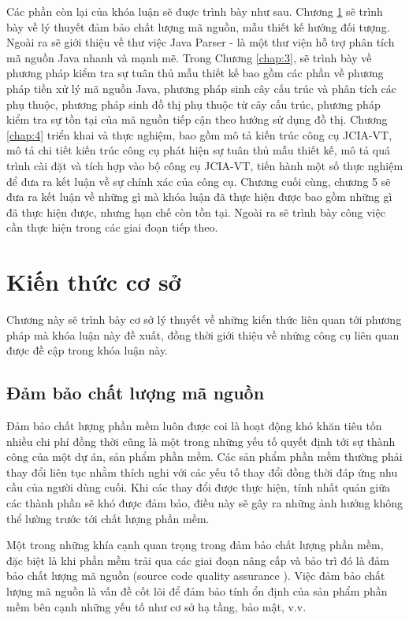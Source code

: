\documentclass[12pt]{report}
\begin{document}
\noindent Các phần còn lại của khóa luận sẽ đuợc trình bày như sau. Chương \ref{chap:background} sẽ trình bày về lý thuyết đảm bảo chất lượng mã nguồn, mẫu thiết kế hướng đối tượng. Ngoài ra sẽ giới thiệu về thư việc Java Parser - là một thư viện hỗ trợ phân tích mã nguồn Java nhanh và mạnh mẽ. Trong Chương \ref{chap:3}, sẽ trình bày về phương pháp kiểm tra sự tuân thủ mẫu thiết kế bao gồm các phần về phương pháp tiền xử lý mã nguồn Java, phương pháp sinh cây cấu trúc và phân tích các phụ thuộc, phương pháp sinh đồ thị phụ thuộc từ cây cấu trúc, phương pháp kiểm tra sự tồn tại của mã nguồn tiếp cận theo hướng sử dụng đồ thị. Chương \ref{chap:4} triển khai và thực nghiệm, bao gồm mô tả kiến trúc công cụ JCIA-VT, mô tả chi tiết kiến trúc công cụ phát hiện sự tuân thủ mẫu thiết kế, mô tả quá trình cài đặt và tích hợp vào bộ công cụ JCIA-VT, tiến hành một số thực nghiệm để đưa ra kết luận về sự chính xác của công cụ.  Chương cuối cùng, chương 5 sẽ đưa ra kết luận về những gì mà khóa luận đã thực hiện được bao gồm những gì đã thực hiện được, nhưng hạn chế còn tồn tại. Ngoài ra sẽ trình bày công việc cần thực hiện trong các giai đoạn tiếp theo.

\chapter{Kiến thức cơ sở}
\label{chap:background}
Chương này sẽ trình bày cơ sở lý thuyết về những kiến thức liên quan tới phương pháp mà khóa luận này đề xuất, đồng thời giới thiệu về những công cụ liên quan được đề cập trong khóa luận này.
\section{Đảm bảo chất lượng mã nguồn}
Đảm bảo chất lượng phần mềm luôn được coi là hoạt động khó khăn tiêu tốn nhiều chi phí đồng thời cũng là một trong những yếu tố quyết định tới sự thành công của một dự án, sản phẩm phần mềm. Các sản phẩm phần mềm thường phải thay đổi liên tục nhằm thích nghi với các yếu tố thay đổi đồng thời đáp ứng nhu cầu của người dùng cuối. Khi các thay đổi được thực hiện, tính nhất quán giữa các thành phần sẽ khó được đảm bảo, điều này sẽ gây ra những ảnh hưởng không thể lường trước tới chất lượng phần mềm.

\noindent Một trong những khía cạnh quan trọng trong đảm bảo chất lượng phần mềm, đặc biệt là khi phần mềm trải qua các giai đoạn nâng cấp và bảo trì đó là đảm bảo chất lượng mã nguồn (source code quality assurance \cite{code-review}). Việc đảm bảo chất lượng mã nguồn là vấn đề cốt lõi để đảm bảo tính ổn định của sản phẩm phần mềm bên cạnh những yếu tố như cơ sở hạ tầng, bảo mật, v.v.
\end{document}
